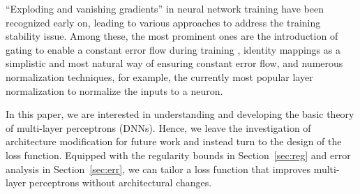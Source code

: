 ``Exploding and vanishing gradients'' in neural network training have been recognized early
on, leading to various approaches to address the training stability issue. Among these, the
most prominent ones are the introduction of gating to enable a constant error flow
during training \cite{LSTM97}, identity mappings \cite{StableNN,ResNet1,ResNet2}
as a simplistic and most natural way of ensuring constant error flow, and numerous normalization
techniques, for example, the currently most popular layer normalization \cite{LayerNorm} to normalize the
inputs to a neuron.

In this paper, we are interested in understanding and developing the basic theory of multi-layer perceptrons (DNNs). Hence, we leave the investigation
of architecture modification for future work and instead turn to the design of the loss function.
Equipped with the regularity bounds in Section~\ref{sec:reg} and error analysis in Section~\ref{sec:err},
we can tailor a loss function that improves multi-layer perceptrons without architectural changes.